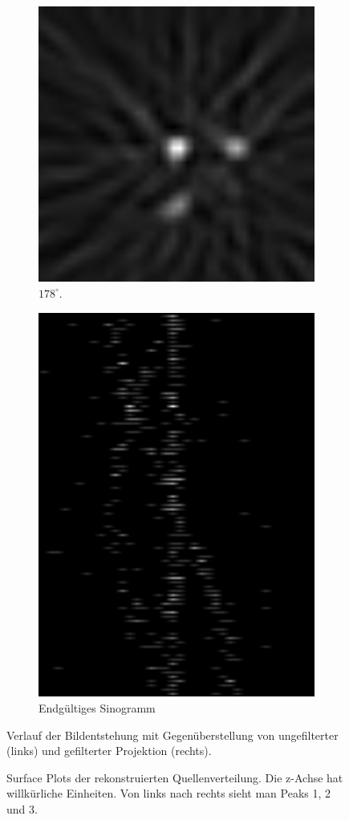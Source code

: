 \documentclass[slug=PET, room=Andreas-Schubert-Bau\,\ 424A, supervisor=Carsten\ Bittrich, coursedate=10.\ 01.\ 2020]{../../Lab_Report_LaTeX/lab_report}
\begin{document}
\begin{figure}[htp]
\begin{subfigure}{0.5\textwidth}
    \includegraphics[width=.4\textwidth]{../messungen/oliTOM1/15_gefiltert.png}
    \caption{\(178^\circ\).}
    \label{eq:tom1-178}
  \end{subfigure}
  \begin{subfigure}{\textwidth}
    \centering
    \includegraphics[width=.3\textwidth, angle=90]{../messungen/oliTOM1/sino.png}
    \caption{Endg\"ultiges Sinogramm}
    \label{fig:tom1-sino}
  \end{subfigure}
  \caption{Verlauf der Bildentstehung mit Gegenüberstellung von
    ungefilterter (links) und gefilterter Projektion (rechts).}
  \label{fig:tom1}
\end{figure}

\begin{figure}[bp]\centering
  
  \caption[Rekonstruierte Quellenverteilung]{Surface Plots der
    rekonstruierten Quellenverteilung. Die z-Achse hat willk\"urliche
    Einheiten. Von links nach rechts sieht man Peaks 1, 2 und 3.}
  \label{fig:tom1-3dplot}
\end{figure}
\end{document}
